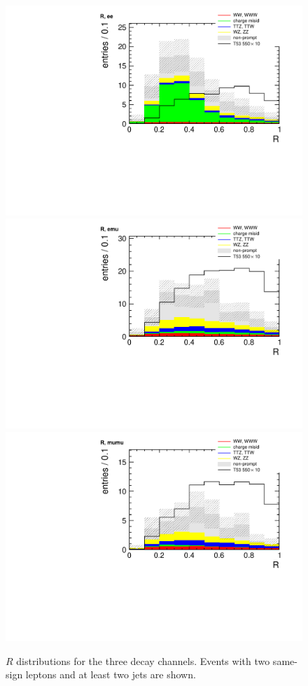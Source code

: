 \begin{figure}[htb]
    \centering
    \includegraphics[width=.7\textwidth]{images/pdf/r_ee_0}
    \includegraphics[width=.7\textwidth]{images/pdf/r_emu_0}
    \includegraphics[width=.7\textwidth]{images/pdf/r_mumu_0}
    \caption{$R$ distributions for the three decay channels. Events with two same-sign leptons and at least
two jets are shown.}
    \label{fig:r_nobtag_app}
\end{figure}

